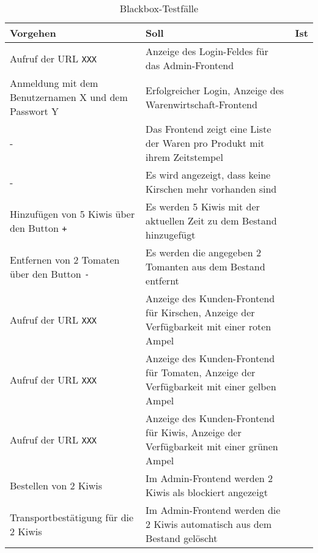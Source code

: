\begin{table}[H]
\begin{small}
	\begin{center}
  	\caption{Blackbox-Testfälle}
   	\renewcommand{\arraystretch}{1.2}
    \begin{tabularx}{\textwidth}{|X|X|L{2cm}|}		
    
    \hline
    			
    \textbf{Vorgehen} & \textbf{Soll} & \textbf{Ist} \\ \hline
    
    Aufruf der URL \texttt{XXX} & 
    Anzeige des Login-Feldes für das Admin-Frontend &
     \\ \hline
    
    Anmeldung mit dem Benutzernamen X und dem Passwort Y & 
    Erfolgreicher Login, Anzeige des Warenwirtschaft-Frontend &
     \\ \hline
    
    - & 
    Das Frontend zeigt eine Liste der Waren pro Produkt mit ihrem Zeitstempel &
     \\ \hline
     
     - &
     Es wird angezeigt, dass keine Kirschen mehr vorhanden sind & 
    \\ \hline
    
    Hinzufügen von 5 Kiwis über den Button \texttt{+} &
    Es werden 5 Kiwis mit der aktuellen Zeit zu dem Bestand hinzugefügt &
    \\ \hline
    
    Entfernen von 2 Tomaten über den Button \texttt{-} &
    Es werden die angegeben 2 Tomanten aus dem Bestand entfernt & 
    \\ \hline
    
    Aufruf der URL \texttt{XXX} &
    Anzeige des Kunden-Frontend für Kirschen,
    Anzeige der Verfügbarkeit mit einer roten Ampel &
    \\ \hline
    
    Aufruf der URL \texttt{XXX} &
    Anzeige des Kunden-Frontend für Tomaten,
    Anzeige der Verfügbarkeit mit einer gelben Ampel &
	\\ \hline
    
    Aufruf der URL \texttt{XXX} &
    Anzeige des Kunden-Frontend für Kiwis,
    Anzeige der Verfügbarkeit mit einer grünen Ampel &
	\\ \hline
	
	Bestellen von 2 Kiwis &
	Im Admin-Frontend werden 2 Kiwis als blockiert angezeigt &
	\\ \hline
	
	Transportbestätigung für die 2 Kiwis &
	Im Admin-Frontend werden die 2 Kiwis automatisch aus dem Bestand gelöscht & 
	\\ \hline
	
	\end{tabularx}
	\label{tabl:Backbox-Testfaelle}
	\end{center}
\end{small}
\end{table}

 